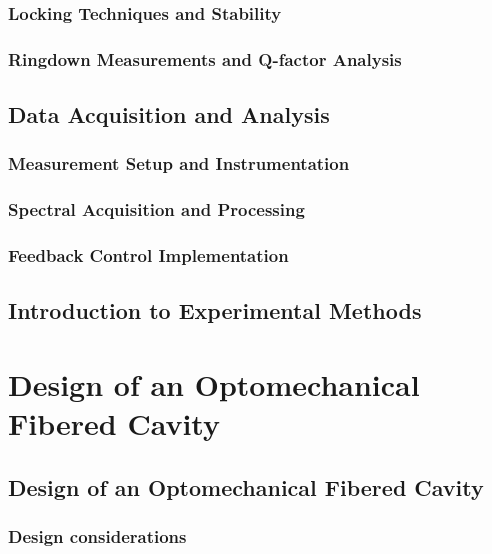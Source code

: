 \subsection{Locking Techniques and Stability}
\subsection{Ringdown Measurements and Q-factor Analysis}
\section{Data Acquisition and Analysis}
\subsection{Measurement Setup and Instrumentation}
\subsection{Spectral Acquisition and Processing}
\subsection{Feedback Control Implementation}
\section{Introduction to Experimental Methods}

\chapter{Design of an Optomechanical Fibered Cavity}

\section{Design of an Optomechanical Fibered Cavity}
\subsection{Design considerations}
\newpage 
